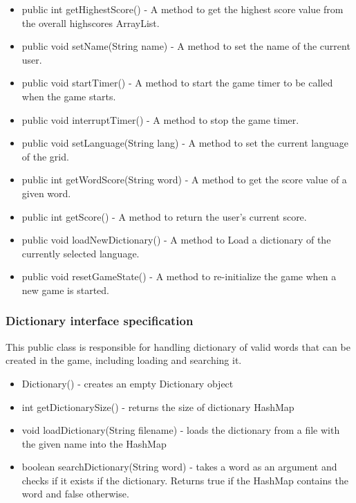 \begin{itemize}
            \item public int getHighestScore() - A method to get the highest score value from the overall highscores ArrayList.
            \item public void setName(String name) - A method to set the name of the current user.
            \item public void startTimer() - A method to start the game timer to be called when the game starts.
            \item public void interruptTimer() - A method to stop the game timer.
            \item public void setLanguage(String lang) - A method to set the current language of the grid.
            \item public int getWordScore(String word) - A method to get the score value of a given word.
            \item public int getScore() - A method to return the user's current score.
            \item public void loadNewDictionary() - A method to Load a dictionary of the currently selected language.
            \item public void resetGameState() - A method to re-initialize the game when a new game is started.
         \end{itemize}
        
        
		\subsubsection{Dictionary interface specification} %
        This public class is responsible for handling dictionary of valid words that can be created in the game, including loading and searching it.
        \begin{itemize}
        \item Dictionary() - creates an empty Dictionary object
\item  int getDictionarySize() - returns the size of dictionary HashMap
\item  void loadDictionary(String filename) - loads the dictionary from a file with the given name into the HashMap
\item boolean searchDictionary(String word) - takes a word as an argument and checks if it exists if the dictionary. Returns true if the HashMap contains the word and false otherwise.

	\end{itemize}

